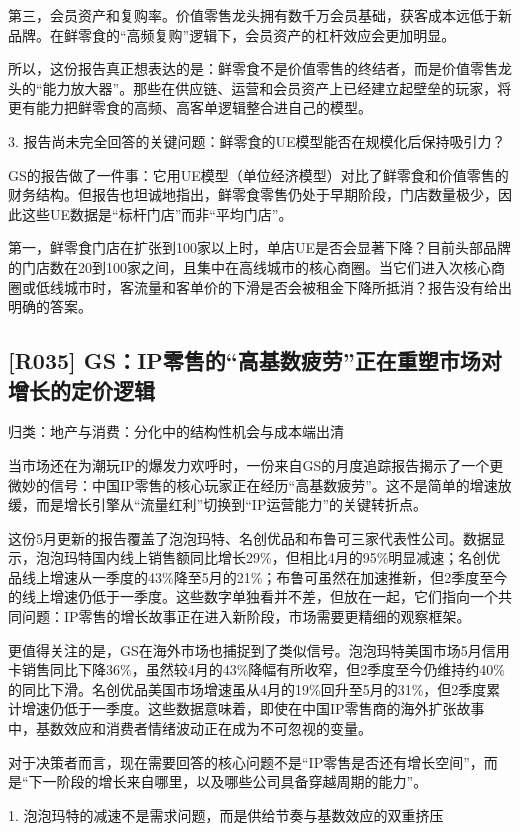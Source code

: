 \documentclass[11pt]{ctexart}
\begin{document}
第三，会员资产和复购率。价值零售龙头拥有数千万会员基础，获客成本远低于新品牌。在鲜零食的“高频复购”逻辑下，会员资产的杠杆效应会更加明显。

所以，这份报告真正想表达的是：鲜零食不是价值零售的终结者，而是价值零售龙头的“能力放大器”。那些在供应链、运营和会员资产上已经建立起壁垒的玩家，将更有能力把鲜零食的高频、高客单逻辑整合进自己的模型。

3. 报告尚未完全回答的关键问题：鲜零食的UE模型能否在规模化后保持吸引力？

GS的报告做了一件事：它用UE模型（单位经济模型）对比了鲜零食和价值零售的财务结构。但报告也坦诚地指出，鲜零食零售仍处于早期阶段，门店数量极少，因此这些UE数据是“标杆门店”而非“平均门店”。

第一，鲜零食门店在扩张到100家以上时，单店UE是否会显著下降？目前头部品牌的门店数在20到100家之间，且集中在高线城市的核心商圈。当它们进入次核心商圈或低线城市时，客流量和客单价的下滑是否会被租金下降所抵消？报告没有给出明确的答案。

\subsection{[R035] GS：IP零售的“高基数疲劳”正在重塑市场对增长的定价逻辑}
{\small\color{refgray}归类：地产与消费：分化中的结构性机会与成本端出清}

当市场还在为潮玩IP的爆发力欢呼时，一份来自GS的月度追踪报告揭示了一个更微妙的信号：中国IP零售的核心玩家正在经历“高基数疲劳”。这不是简单的增速放缓，而是增长引擎从“流量红利”切换到“IP运营能力”的关键转折点。

这份5月更新的报告覆盖了泡泡玛特、名创优品和布鲁可三家代表性公司。数据显示，泡泡玛特国内线上销售额同比增长29\%，但相比4月的95\%明显减速；名创优品线上增速从一季度的43\%降至5月的21\%；布鲁可虽然在加速推新，但2季度至今的线上增速仍低于一季度。这些数字单独看并不差，但放在一起，它们指向一个共同问题：IP零售的增长故事正在进入新阶段，市场需要更精细的观察框架。

更值得关注的是，GS在海外市场也捕捉到了类似信号。泡泡玛特美国市场5月信用卡销售同比下降36\%，虽然较4月的43\%降幅有所收窄，但2季度至今仍维持约40\%的同比下滑。名创优品美国市场增速虽从4月的19\%回升至5月的31\%，但2季度累计增速仍低于一季度。这些数据意味着，即使在中国IP零售商的海外扩张故事中，基数效应和消费者情绪波动正在成为不可忽视的变量。

对于决策者而言，现在需要回答的核心问题不是“IP零售是否还有增长空间”，而是“下一阶段的增长来自哪里，以及哪些公司具备穿越周期的能力”。

1. 泡泡玛特的减速不是需求问题，而是供给节奏与基数效应的双重挤压
\end{document}
